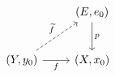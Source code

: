 \documentclass{article}
\begin{document}
    \begin{equation*}
        \begin{tikzcd}[row sep = 0.35in]
            & \l(E,e_0\r) \ar[d, "p"] \\
            \tpl{Y,y_0} \ar[ur, "\widetilde{f}", dashed] \ar[r, "f"'] & \tpl{X,x_0}
        \end{tikzcd}
    \end{equation*}
\end{document}
